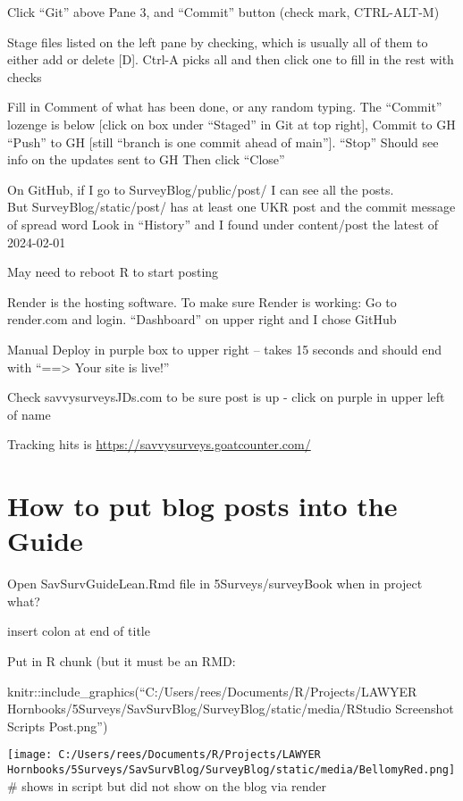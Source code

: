 \documentclass[
]{article}
\begin{document}
Click ``Git'' above Pane 3, and ``Commit'' button (check mark,
CTRL-ALT-M)

Stage files listed on the left pane by checking, which is usually all of
them to either add or delete {[}D{]}. Ctrl-A picks all and then click
one to fill in the rest with checks

Fill in Comment of what has been done, or any random typing. The
``Commit'' lozenge is below {[}click on box under ``Staged'' in Git at
top right{]}, Commit to GH ``Push'' to GH {[}still ``branch is one
commit ahead of main''{]}. ``Stop'' Should see info on the updates sent
to GH Then click ``Close''

On GitHub, if I go to SurveyBlog/public/post/ I can see all the posts.\\
But SurveyBlog/static/post/ has at least one UKR post and the commit
message of spread word Look in ``History'' and I found under
content/post the latest of 2024-02-01

May need to reboot R to start posting

Render is the hosting software. To make sure Render is working: Go to
render.com and login. ``Dashboard'' on upper right and I chose GitHub

Manual Deploy in purple box to upper right -- takes 15 seconds and
should end with ``==\textgreater{} Your site is live!''

Check savvysurveysJDs.com to be sure post is up - click on purple in
upper left of name

Tracking hits is \url{https://savvysurveys.goatcounter.com/}

\hypertarget{how-to-put-blog-posts-into-the-guide}{%
\section{How to put blog posts into the
Guide}\label{how-to-put-blog-posts-into-the-guide}}

Open SavSurvGuideLean.Rmd file in 5Surveys/surveyBook when in project
what?

insert colon at end of title

Put in R chunk (but it must be an RMD:

knitr::include\_graphics(``C:/Users/rees/Documents/R/Projects/LAWYER
Hornbooks/5Surveys/SavSurvBlog/SurveyBlog/static/media/RStudio
Screenshot Scripts Post.png'')

\texttt{[image: C:/Users/rees/Documents/R/Projects/LAWYER Hornbooks/5Surveys/SavSurvBlog/SurveyBlog/static/media/BellomyRed.png]}
\# shows in script but did not show on the blog via render
\end{document}
